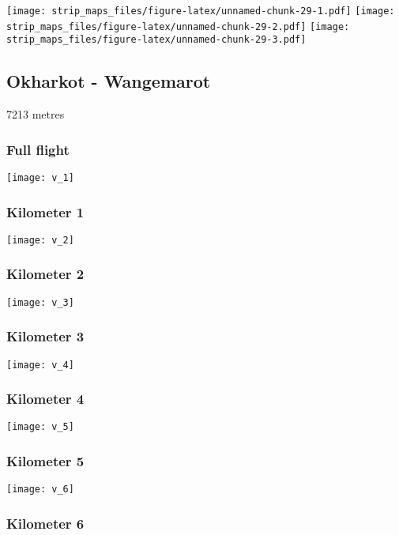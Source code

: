 \documentclass[]{article}
\begin{document}
\texttt{[image: strip\_maps\_files/figure-latex/unnamed-chunk-29-1.pdf]}
\texttt{[image: strip\_maps\_files/figure-latex/unnamed-chunk-29-2.pdf]}
\texttt{[image: strip\_maps\_files/figure-latex/unnamed-chunk-29-3.pdf]}

\newpage

\subsection{Okharkot - Wangemarot}\label{okharkot---wangemarot}

7213 metres

\subsubsection{Full flight}\label{full-flight-21}

\texttt{[image: v\_1]}

\subsubsection{Kilometer 1}\label{kilometer-1-21}

\texttt{[image: v\_2]}

\subsubsection{Kilometer 2}\label{kilometer-2-21}

\texttt{[image: v\_3]}

\subsubsection{Kilometer 3}\label{kilometer-3-21}

\texttt{[image: v\_4]}

\subsubsection{Kilometer 4}\label{kilometer-4-20}

\texttt{[image: v\_5]}

\subsubsection{Kilometer 5}\label{kilometer-5-18}

\texttt{[image: v\_6]}

\subsubsection{Kilometer 6}\label{kilometer-6-14}
\end{document}
